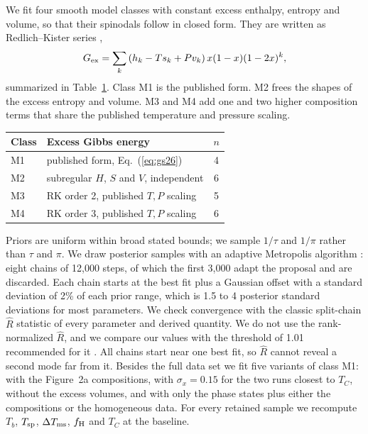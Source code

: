 We fit four smooth model classes with constant excess enthalpy, entropy and volume, so that
their spinodals follow in closed form. They are written as Redlich--Kister series
\cite{redlich1948},
\begin{equation}
G_{\rm ex} = \sum_k \left(h_k - T s_k + P v_k\right) x(1-x)(1-2x)^k,
\label{eq:rk}
\end{equation}
summarized in Table~\ref{tab:classes}. Class M1 is the published form. M2 frees the shapes
of the excess entropy and volume. M3 and M4 add one and two higher composition terms that
share the published temperature and pressure scaling.

\begin{table}[t]
\label{tab:classes}
\small\centering
\begin{tabular}{@{}llc@{}}
\toprule
Class & Excess Gibbs energy & $n$\\
\midrule
M1 & published form, Eq.~(\ref{eq:gs26}) & 4\\
M2 & subregular $H$, $S$ and $V$, independent & 6\\
M3 & RK order 2, published $T,P$ scaling & 5\\
M4 & RK order 3, published $T,P$ scaling & 6\\
\bottomrule
\end{tabular}
\end{table}

Priors are uniform within broad stated bounds; we sample $1/\tau$ and $1/\pi$ rather than
$\tau$ and $\pi$. We draw posterior samples with an adaptive Metropolis algorithm
\cite{haario2001}: eight chains of 12,000 steps, of which the first 3,000 adapt the proposal
and are discarded. Each chain starts at the best fit plus a Gaussian offset with a standard
deviation of 2\% of each prior range, which is 1.5 to 4 posterior standard deviations for
most parameters. We check convergence with the classic split-chain $\hat R$ statistic
\cite{gelman2013} of every parameter and derived quantity. We do not use the rank-normalized
$\hat R$, and we compare our values with the threshold of 1.01 recommended for it
\cite{vehtari2021}. All chains start near one best fit, so $\hat R$ cannot reveal a second mode
far from it. Besides the full data set we fit five variants of class M1: with the
Figure~2a compositions, with $\sigma_x = 0.15$ for the two runs closest to $T_C$, without
the excess volumes, and with only the phase states plus either the compositions or the
homogeneous data. For every retained sample we recompute $T_b$, $T_{\rm sp}$,
$\Delta T_{\rm ms}$, $f_{\rm H}$ and $T_C$ at the baseline.

